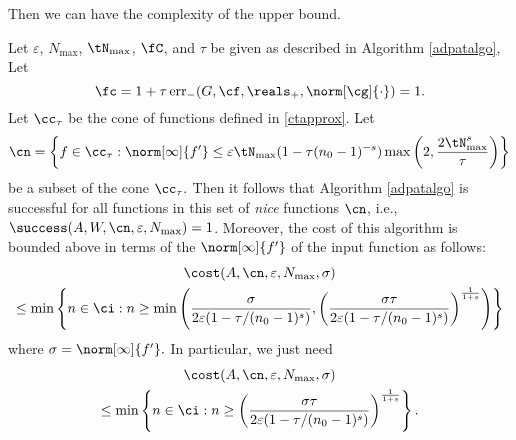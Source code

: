 Then we can have the complexity of the upper bound.
\begin{theorem}   Let  $\varepsilon$, $N_{\max}$, $\tN_{\max}$, $\fC$, and $\tau$ be given as described in Algorithm \ref{adpatalgo},  Let
\begin{equation} \label{normdeflate}
\fc =1 + \tau \err_{-}(G,\cf,\reals_+,\norm[\cg]{\cdot}) =1.
\end{equation}
Let $\cc_\tau$ be the cone of functions defined in \eqref{ctapprox}.  Let
\begin{equation} \label{nicefdef}
\cn = \left \{ f \in \cc_\tau : \norm[\infty]{f'} \le \varepsilon \tN_{\max}(1 - \tau (n_0-1)^{-s}) \max\left( 2, \frac{2\tN_{\max}^{s}}{\tau} \right ) \right\}
\end{equation}
be a subset of the cone $\cc_\tau.$  Then it follows that Algorithm \ref{adpatalgo} is successful for all functions in this set of \emph{nice} functions $\cn$,  i.e.,  $\success(A,W,\cn,\varepsilon,N_{\max}) = 1$.  Moreover, the cost of this algorithm is bounded above in terms of the $\norm[\infty]{f'}$ of the input function as follows:
\begin{multline} 
\cost(A,\cn,\varepsilon,N_{\max},\sigma) \\
\le  \min\left\{ n \in \ci : n \ge \min\left( \frac{\sigma}{2\varepsilon(1 - \tau/(n_{0}-1)^{s})} , \left(\frac{\sigma\tau}{2\varepsilon(1 - \tau/(n_{0}-1)^{s})}\right)^{\frac{1}{1+s}}\right)  \right\}
\end{multline} where $\sigma=\norm[\infty]{f'}.$
In particular, we just need 
\begin{multline}
\cost(A,\cn,\varepsilon,N_{\max},\sigma) \\
\le  \min\left\{ n \in \ci : n \ge  \left(\frac{\sigma\tau}{2\varepsilon(1 - \tau/(n_{0}-1)^{s})}\right)^{\frac{1}{1+s}}  \right\}.
\end{multline} 


\end{theorem}

